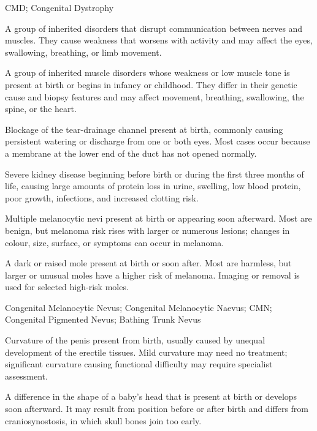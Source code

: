 \synonyms
CMD; Congenital Dystrophy

 A group of inherited disorders that disrupt communication between nerves and muscles. They cause weakness that worsens with activity and may affect the eyes, swallowing, breathing, or limb movement.

 A group of inherited muscle disorders whose weakness or low muscle tone is present at birth or begins in infancy or childhood. They differ in their genetic cause and biopsy features and may affect movement, breathing, swallowing, the spine, or the heart.

 Blockage of the tear-drainage channel present at birth, commonly causing persistent watering or discharge from one or both eyes. Most cases occur because a membrane at the lower end of the duct has not opened normally.

 Severe kidney disease beginning before birth or during the first three months of life, causing large amounts of protein loss in urine, swelling, low blood protein, poor growth, infections, and increased clotting risk.

 Multiple melanocytic nevi present at birth or appearing soon afterward. Most are benign, but melanoma risk rises with larger or numerous lesions; changes in colour, size, surface, or symptoms can occur in melanoma.

 A dark or raised mole present at birth or soon after. Most are harmless, but larger or unusual moles have a higher risk of melanoma. Imaging or removal is used for selected high-risk moles.

\synonyms
Congenital Melanocytic Nevus; Congenital Melanocytic Naevus; CMN; Congenital Pigmented Nevus; Bathing Trunk Nevus

 Curvature of the penis present from birth, usually caused by unequal development of the erectile tissues. Mild curvature may need no treatment; significant curvature causing functional difficulty may require specialist assessment.

 A difference in the shape of a baby's head that is present at birth or develops soon afterward. It may result from position before or after birth and differs from craniosynostosis, in which skull bones join too early.

